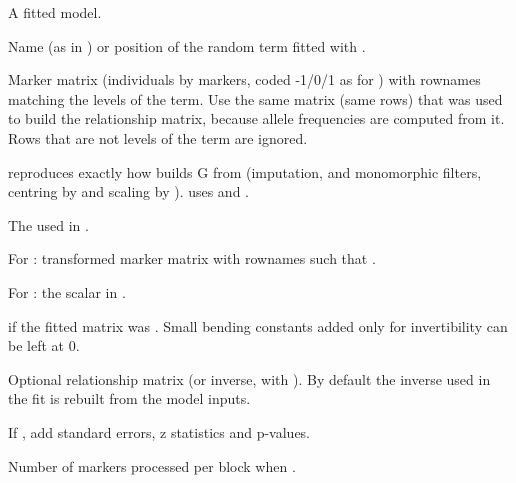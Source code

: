 \documentclass[a4paper]{book}
\begin{document}
\begin{Arguments}
\begin{ldescription}
\item[\code{object}] A fitted  model.
\item[\code{term}] Name (as in ) or position of the random term fitted with .
\item[\code{M}] Marker matrix (individuals by markers, coded -1/0/1 as for
) with rownames matching the levels of the term. Use the
same matrix (same rows) that was used to build the relationship matrix,
because allele frequencies are computed from it. Rows that are not levels of
the term are ignored.
\item[\code{method}]  reproduces exactly how 
builds G from  (imputation,  and monomorphic filters,
centring by  and scaling by ).  uses
 and .
\item[\code{min.MAF}] The  used in .
\item[\code{Z}] For : transformed marker matrix with rownames
such that .
\item[\code{scale}] For : the scalar  in .
\item[\code{blend}] \eqn{\lambda}{} if the fitted matrix was .
Small bending constants added only for invertibility can be left at 0.
\item[\code{Gu}] Optional relationship matrix (or inverse, with ).
By default the inverse used in the fit is rebuilt from the model inputs.
\item[\code{se}] If , add standard errors, z statistics and p-values.
\item[\code{chunk}] Number of markers processed per block when .
\end{ldescription}
\end{Arguments}
%
\end{document}
